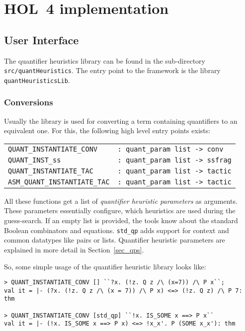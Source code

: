 \documentclass[a4paper,12pt,DIV=12,oneside]{scrbook}
\theoremstyle{definition}
\theoremstyle{remark}
\begin{document}
\chapter{HOL~4 implementation}

\section{User Interface}\label{sec_interface}

The quantifier heuristics library can be found in the sub-directory
\texttt{src/quantHeuristics}.  The entry point to the framework is the
library \texttt{quantHeuristicsLib}.

\subsection{Conversions}
Usually the library is used for
converting a term containing quantifiers to an equivalent one. For this,
the following high level entry points exists:
\bigskip

\noindent
\begin{tabular}{@{}ll}
\texttt{QUANT\_INSTANTIATE\_CONV} & \texttt{: quant\_param list -> conv} \\
\texttt{QUANT\_INST\_ss} & \texttt{: quant\_param list -> ssfrag} \\
\texttt{QUANT\_INSTANTIATE\_TAC} & \texttt{: quant\_param list -> tactic} \\
\texttt{ASM\_QUANT\_INSTANTIATE\_TAC} & \texttt{: quant\_param list -> tactic}
\end{tabular}
\bigskip

All these functions get a list of \emph{quantifier heuristic parameters} as arguments. These
parameters essentially configure, which heuristics are used during the guess-search. If
an empty list is provided, the tools know about the standard Boolean combinators and equations.
\texttt{std\_qp} adds support for context and common datatypes like pairs or lists.
Quantifier heuristic parameters are explained in more detail in
Section~\ref{sec_qps}.

So, some simple usage of the quantifier heuristic library looks like:
{\scriptsize
\begin{verbatim}
> QUANT_INSTANTIATE_CONV [] ``?x. (!z. Q z /\ (x=7)) /\ P x``;
val it = |- (?x. (!z. Q z /\ (x = 7)) /\ P x) <=> (!z. Q z) /\ P 7: thm

> QUANT_INSTANTIATE_CONV [std_qp] ``!x. IS_SOME x ==> P x``
val it = |- (!x. IS_SOME x ==> P x) <=> !x_x'. P (SOME x_x'): thm
\end{verbatim}}
\end{document}
